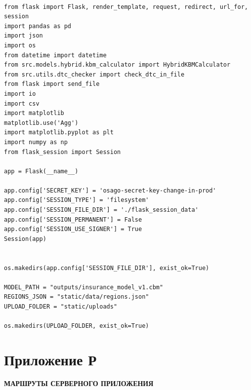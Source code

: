 \vspace{1cm}

\begin{lstlisting}[caption={Основной модуль приложения (app.py)}, label={lst:flask_init}    label={lst:feature_eng},
    breaklines=true,
    breakatwhitespace=true,
    breakindent=10pt,
    columns=fullflexible
]

from flask import Flask, render_template, request, redirect, url_for, session
import pandas as pd
import json
import os
from datetime import datetime
from src.models.hybrid.kbm_calculator import HybridKBMCalculator
from src.utils.dtc_checker import check_dtc_in_file
from flask import send_file
import io
import csv
import matplotlib
matplotlib.use('Agg') 
import matplotlib.pyplot as plt
import numpy as np
from flask_session import Session  

app = Flask(__name__)

app.config['SECRET_KEY'] = 'osago-secret-key-change-in-prod'  
app.config['SESSION_TYPE'] = 'filesystem'  
app.config['SESSION_FILE_DIR'] = './flask_session_data'
app.config['SESSION_PERMANENT'] = False
app.config['SESSION_USE_SIGNER'] = True
Session(app)


os.makedirs(app.config['SESSION_FILE_DIR'], exist_ok=True)

MODEL_PATH = "outputs/insurance_model_v1.cbm"
REGIONS_JSON = "static/data/regions.json"
UPLOAD_FOLDER = "static/uploads"

os.makedirs(UPLOAD_FOLDER, exist_ok=True)
\end{lstlisting}

\newpage
\section*{Приложение Р}
\label{app:routes}
\begin{center}
\textbf{МАРШРУТЫ СЕРВЕРНОГО ПРИЛОЖЕНИЯ}
\end{center}

\vspace{1cm}

